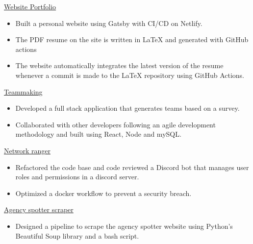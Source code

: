 
\href{https://rsun.dev}{Website Portfolio}
\begin{itemize}
    \item Built a personal website using Gatsby with CI/CD on Netlify.
    \item The PDF resume on the site is written in \LaTeX{} and generated with GitHub actions
    \item The website automatically integrates the latest version of the resume whenever a commit is made to the \LaTeX{} repository using GitHub Actions.
\end{itemize}
    
\href{https://github.com/ngrover2/teammaking}{Teammaking}
\begin{itemize}
    \item Developed a full stack application that generates teams based on a survey.
    \item Collaborated with other developers following an agile development methodology and built using React, Node and mySQL.
\end{itemize}


\href{https://github.com/networking-discord/network-ranger}{Network ranger}
\begin{itemize}
    \item Refactored the code base and code reviewed a Discord bot that manages user roles and permissions in a discord server.
    \item Optimized  a docker workflow to prevent a security breach.
\end{itemize}

\href{https://github.com/rahul-sundaresan/agency-spotter-scraper}{Agency spotter scraper}
\begin{itemize}
    \item Designed a pipeline to scrape the agency spotter website using Python's Beautiful Soup library and a bash script.
\end{itemize}

